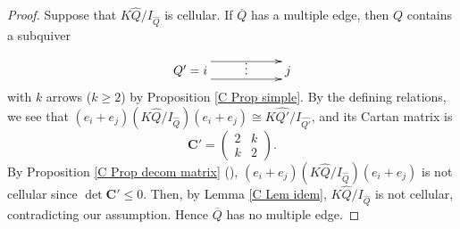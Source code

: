 \documentclass[12pt]{amsart}
\numberwithin{equation}{thm}
\newcommand\bC{\mathbf C}
\newcommand\wh{\widehat}
\newcommand\ol{\overline}
\newcounter{ni}
\newcounter{yon}
\newcommand{\roiv}{\roman{yon}}
\begin{document}
\begin{proof} 
Suppose that $K \wh{Q}/ I_{\wh{Q}}$ is cellular.
If $\ol{Q}$ has a multiple edge, 
then $Q$ contains a subquiver 
\[
\xymatrix{Q' =  i \ar[rr]<-1.5ex>   \ar[rr]<1.8ex> & \vdots  & j }
\]
with $k$ arrows ($k \geq 2$) by Proposition \ref{C Prop simple}.  
By the defining relations, 
we see that $(e_i + e_j)(K\wh{Q} / I_{\wh{Q}})(e_i + e_j) \cong K \wh{Q'} / I_{\wh{Q'}}$, 
and its Cartan matrix is
\[
\bC'=\begin{pmatrix} 2 & k \\ k & 2 \end{pmatrix}. 
\]
By Proposition \ref{C Prop decom matrix} (\roiv), 
$(e_i + e_j)(K\wh{Q} / I_{\wh{Q}})(e_i + e_j)$ is not cellular 
since $\det \bC' \leq 0$. 
Then, by Lemma \ref{C Lem idem}, 
$K \wh{Q}/ I_{\wh{Q}}$ is not cellular, contradicting our assumption. Hence
$\ol{Q}$ has no multiple edge. 


\end{proof}
\end{document}
